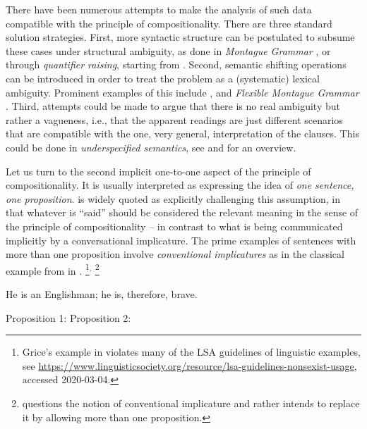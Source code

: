 \documentclass[output=paper]{langscibook}
\begin{document}
\begin{sloppypar}
  There have been numerous attempts to make the analysis of such data
  compatible with the principle of compositionality. There are three
  standard solution strategies.  First, more syntactic structure can
  be postulated to subsume these cases under structural ambiguity, as
  done in \emph{Montague Grammar} \citep{Montague:PTQ}, or through
  \emph{quantifier raising}, starting from \citet{May:77}.  Second,
  semantic shifting operations can be introduced in order to treat the
  problem as a (systematic) lexical ambiguity.  Prominent examples of
  this include \citet{Link:83}, \citet{Partee:Rooth:83} and
  \emph{Flexible Montague Grammar} \citep{Hendriks:93}.  Third,
  attempts could be made to argue that there is no real ambiguity but
  rather a vagueness, i.e., that the apparent readings are just
  different scenarios that are compatible with the one, very general,
  interpretation of the clauses. This could be done in
  \emph{underspecified semantics}, see \citet{Pinkal:99} and
  \citet{Egg:11} for an overview.
\end{sloppypar}


Let us turn to the second implicit one-to-one aspect of the principle
of compositionality.  It is usually interpreted as expressing the idea
of \emph{one sentence, one proposition}.  \citet{Bach:99} is widely
quoted as explicitly challenging this assumption, in that
whatever is ``said'' should be considered the relevant meaning in the
sense of the principle of compositionality -- in contrast to what is
being communicated implicitly by a conversational implicature.  The
prime examples of sentences with more than one proposition involve
\emph{conventional implicatures} as in the classical example from
\citet{Grice:75} in .%
\footnote{Grice's example in  violates many of the LSA
  guidelines of linguistic examples, see
  \url{https://www.linguisticsociety.org/resource/lsa-guidelines-nonsexist-usage},
  accessed 2020-03-04.}$^,$%
\footnote{\citet{Bach:99} questions the notion of conventional
  implicature and rather intends to replace it by allowing more than one
  proposition.  }
 
\ea
 He is an Englishman; he is, therefore, brave. 
 \citep[44]{Grice:75}\label{ex-grice}
 \begin{xlist}
 \ex Proposition 1: \label{ex-grice-ai}
 \ex Proposition 2: \label{ex-grice-ci}
 \end{xlist}
\z 
\end{document}
